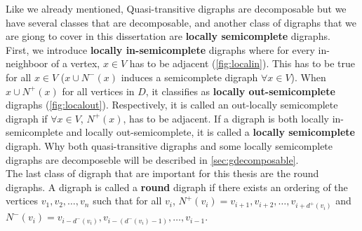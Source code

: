 Like we already mentioned, Quasi-transitive digraphs are decomposable but we have several classes that are decomposable, and another class of digraphs that we are giong to cover in this dissertation are \textbf{locally semicomplete} digraphs.\\
First, we introduce \textbf{locally in-semicomplete} digraphs where for every in-neighboor of a vertex, $x\in V$ has to be adjacent (\autoref{fig:localin}). 
This has to be true for all $x\in V$ ($x\cup N^-(x)$ induces a semicomplete digraph $\forall x\in V$). 
When $x\cup N^+(x)$ for all vertices in $D$, it classifies as \textbf{locally out-semicomplete} digraphs (\autoref{fig:localout}). 
Respectively, it is called an out-locally semicomplete digraph if $\forall x\in V$, $N^+(x)$, has to be adjacent. 
If a digraph is both locally in-semicomplete and locally out-semicomplete, it is called a \textbf{locally semicomplete} digraph. 
Why both quasi-transitive digraphs and some locally semicomplete digraphs are decomposeble will be described in \autoref{sec:gdecomposable}.\\
The last class of digraph that are important for this thesis are the round digraphs. 
A digraph is called a \textbf{round} digraph if there exists an ordering of the vertices $v_1,v_2,\dots,v_n$ such that for all $v_i$, $N^+(v_i)={v_{i+1},v_{i+2},\dots ,v_{i+d^+(v_i)}}$ and $N^-(v_i)={v_{i-d^-(v_i)},v_{i-(d^-(v_i)-1)},\dots ,v_{i-1}}$.




